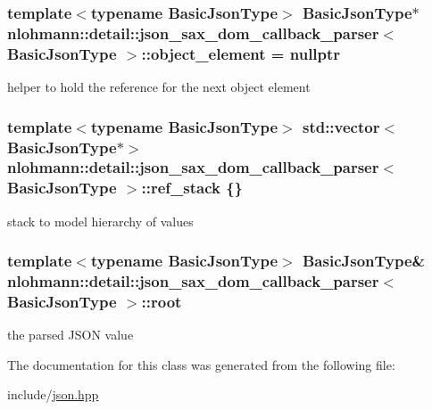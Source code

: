 \subsubsection[{\texorpdfstring{object\+\_\+element}{object_element}}]{\setlength{\rightskip}{0pt plus 5cm}template$<$typename Basic\+Json\+Type$>$ Basic\+Json\+Type$\ast$ {\bf nlohmann\+::detail\+::json\+\_\+sax\+\_\+dom\+\_\+callback\+\_\+parser}$<$ Basic\+Json\+Type $>$\+::object\+\_\+element = nullptr\hspace{0.3cm}{\ttfamily [private]}}\hypertarget{classnlohmann_1_1detail_1_1json__sax__dom__callback__parser_a2a8adecd936ba6ec187f1216241b508f}{}\label{classnlohmann_1_1detail_1_1json__sax__dom__callback__parser_a2a8adecd936ba6ec187f1216241b508f}


helper to hold the reference for the next object element 

\subsubsection[{\texorpdfstring{ref\+\_\+stack}{ref_stack}}]{\setlength{\rightskip}{0pt plus 5cm}template$<$typename Basic\+Json\+Type$>$ std\+::vector$<$Basic\+Json\+Type$\ast$$>$ {\bf nlohmann\+::detail\+::json\+\_\+sax\+\_\+dom\+\_\+callback\+\_\+parser}$<$ Basic\+Json\+Type $>$\+::ref\+\_\+stack \{\}\hspace{0.3cm}{\ttfamily [private]}}\hypertarget{classnlohmann_1_1detail_1_1json__sax__dom__callback__parser_a82a0e49479660b9903597e1ef55c6601}{}\label{classnlohmann_1_1detail_1_1json__sax__dom__callback__parser_a82a0e49479660b9903597e1ef55c6601}


stack to model hierarchy of values 

\subsubsection[{\texorpdfstring{root}{root}}]{\setlength{\rightskip}{0pt plus 5cm}template$<$typename Basic\+Json\+Type$>$ Basic\+Json\+Type\& {\bf nlohmann\+::detail\+::json\+\_\+sax\+\_\+dom\+\_\+callback\+\_\+parser}$<$ Basic\+Json\+Type $>$\+::root\hspace{0.3cm}{\ttfamily [private]}}\hypertarget{classnlohmann_1_1detail_1_1json__sax__dom__callback__parser_a7b12037ca38be3ddec09c42bd71080cc}{}\label{classnlohmann_1_1detail_1_1json__sax__dom__callback__parser_a7b12037ca38be3ddec09c42bd71080cc}


the parsed J\+S\+ON value 



The documentation for this class was generated from the following file\+:\begin{DoxyCompactItemize}
\item 
include/\hyperlink{json_8hpp}{json.\+hpp}\end{DoxyCompactItemize}
